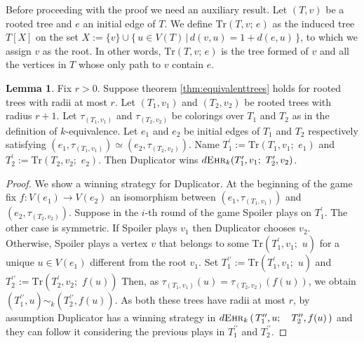 \documentclass[12pt,notitlepage,a4paper]{article}
\theoremstyle{definition}
\newtheorem{lemma}{Lemma}[section]
\newcommand{\ehr}{\textsc{Ehr}}
\begin{document}
Before proceeding with the proof we need  an auxiliary
result. Let $(T,v)$ be a rooted tree and $e$ an 
initial edge of $T$. We define $\mathrm{Tr}(T,v;\, e)$ as
the induced tree $T[X]$ on the set
$X:=\{v\} \cup \{\, u\in V(T) \, | \, d(v,u) = 1 + d(e,u) \,\}$,
to which we assign $v$ as the root. In other words, 
$\mathrm{Tr}\left(T,v;\, e\right)$ is the tree formed of 
$v$ and all the vertices
in $T$ whose only path to $v$ contain $e$. 

\begin{lemma} \label{lem:equivalentedges}
	Fix $r>0$. Suppose theorem \ref{thm:equivalenttrees}
	holds for rooted trees with radii at most $r$.
	Let $(T_1,v_1)$ and $(T_2,v_2)$ be rooted trees with radius
	$r+1$. Let $\tau_{(T_1,v_1)}$ and $\tau_{(T_2,v_2)}$
	be colorings over $T_1$ and $T_2$ as in the
	definition of $k$-equivalence. 
	Let $e_1$ and $e_2$ be initial edges 
	of $T_1$ and $T_2$ respectively satisfying 
	$(e_1,\tau_{(T_1,v_1)})\simeq (e_2,\tau_{(T_2,v_2)})$. Name 
	$T^\prime_1:=\mathrm{Tr}(T_1,v_1; \,\,e_1)$ and 
	$T^\prime_2:=\mathrm{Tr}(T_2,v_2;\,\,e_2)$. Then
	Duplicator wins 
	$d\ehr_{k}(T^\prime_1, v_1; \, \, T^\prime_2,v_2)$.
\end{lemma}
\begin{proof}
	We show a winning strategy for Duplicator.
	At the beginning of the game fix 
	$f:V(e_1)\rightarrow V(e_2)$ an isomorphism between 
	$(e_1,\tau_{(T_1,v_1)})$
	and $(e_2,\tau_{(T_2,v_2)})$.
	Suppose in the $i$-th round of the game Spoiler
	plays on $T^\prime_1$. The other case is symmetric.
	If Spoiler plays $v_1$ then Duplicator chooses $v_2$. 
	Otherwise, Spoiler plays a vertex $v$ that belongs
	to some $\mathrm{Tr}(T^\prime_1,v_1;\,\, u)$ for a unique $u\in V(e_1)$
	different from the root $v_1$. 
	Set $T^{\prime\prime}_1:=
	\mathrm{Tr}\left(T^\prime_1,v_1;\,\, u\right)$
	and
	$T^{\prime\prime}_2:=\mathrm{Tr}\left(T^\prime_2,v_2;\,\, f(u)\right)$
	Then, as $\tau_{(T_1,v_1)}\left(u\right)=\tau_{(T_2,v_2)}\left(f(u)\right)$,
	we obtain
	$\left(T^{\prime\prime}_1,u\right) \sim_k 
	\left(T^{\prime \prime}_2,f(u)\right)$.
	As both these trees have radii at most $r$, 
	by assumption Duplicator has a winning 
	strategy in
	$d\ehr_{k}\left(\,T^{\prime\prime}_1, u;
	\quad T^{\prime \prime}_2, f(u)\,  \right)$		
	and they can follow it considering the previous plays in
	$T^{\prime\prime}_1$ and $T^{\prime\prime}_2$.	
\end{proof}
\end{document}
